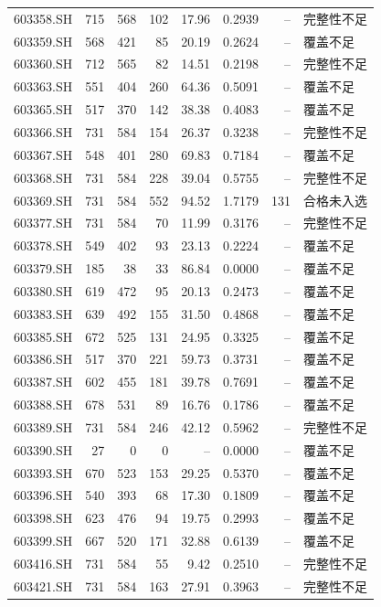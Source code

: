 \documentclass[10pt,a4paper]{article}
\begin{document}
\begin{longtable}{lrrr r r r l}
603358.SH & 715 & 568 & 102 & 17.96 & 0.2939 & -- & 完整性不足\\
603359.SH & 568 & 421 & 85 & 20.19 & 0.2624 & -- & 覆盖不足\\
603360.SH & 712 & 565 & 82 & 14.51 & 0.2198 & -- & 完整性不足\\
603363.SH & 551 & 404 & 260 & 64.36 & 0.5091 & -- & 覆盖不足\\
603365.SH & 517 & 370 & 142 & 38.38 & 0.4083 & -- & 覆盖不足\\
603366.SH & 731 & 584 & 154 & 26.37 & 0.3238 & -- & 完整性不足\\
603367.SH & 548 & 401 & 280 & 69.83 & 0.7184 & -- & 覆盖不足\\
603368.SH & 731 & 584 & 228 & 39.04 & 0.5755 & -- & 完整性不足\\
603369.SH & 731 & 584 & 552 & 94.52 & 1.7179 & 131 & 合格未入选\\
603377.SH & 731 & 584 & 70 & 11.99 & 0.3176 & -- & 完整性不足\\
603378.SH & 549 & 402 & 93 & 23.13 & 0.2224 & -- & 覆盖不足\\
603379.SH & 185 & 38 & 33 & 86.84 & 0.0000 & -- & 覆盖不足\\
603380.SH & 619 & 472 & 95 & 20.13 & 0.2473 & -- & 覆盖不足\\
603383.SH & 639 & 492 & 155 & 31.50 & 0.4868 & -- & 覆盖不足\\
603385.SH & 672 & 525 & 131 & 24.95 & 0.3325 & -- & 覆盖不足\\
603386.SH & 517 & 370 & 221 & 59.73 & 0.3731 & -- & 覆盖不足\\
603387.SH & 602 & 455 & 181 & 39.78 & 0.7691 & -- & 覆盖不足\\
603388.SH & 678 & 531 & 89 & 16.76 & 0.1786 & -- & 覆盖不足\\
603389.SH & 731 & 584 & 246 & 42.12 & 0.5962 & -- & 完整性不足\\
603390.SH & 27 & 0 & 0 & -- & 0.0000 & -- & 覆盖不足\\
603393.SH & 670 & 523 & 153 & 29.25 & 0.5370 & -- & 覆盖不足\\
603396.SH & 540 & 393 & 68 & 17.30 & 0.1809 & -- & 覆盖不足\\
603398.SH & 623 & 476 & 94 & 19.75 & 0.2993 & -- & 覆盖不足\\
603399.SH & 667 & 520 & 171 & 32.88 & 0.6139 & -- & 覆盖不足\\
603416.SH & 731 & 584 & 55 & 9.42 & 0.2510 & -- & 完整性不足\\
603421.SH & 731 & 584 & 163 & 27.91 & 0.3963 & -- & 完整性不足\\

\end{longtable}
\end{document}
